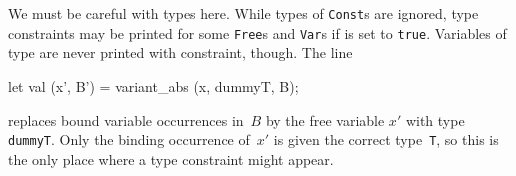 We must be careful with types here.  While types of {\tt Const}s are
ignored, type constraints may be printed for some {\tt Free}s and
{\tt Var}s if  is set to {\tt true}.  Variables of type
 are never printed with constraint, though.  The line
\begin{ttbox}
        let val (x', B') = variant_abs (x, dummyT, B);
\end{ttbox}
replaces bound variable occurrences in~$B$ by the free variable $x'$ with
type {\tt dummyT}.  Only the binding occurrence of~$x'$ is given the
correct type~{\tt T}, so this is the only place where a type
constraint might appear.
